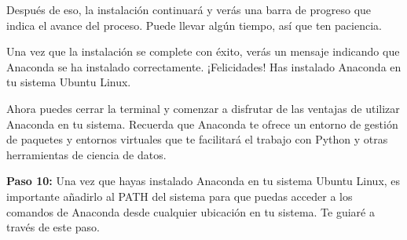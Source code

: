 \documentclass[
  letterpaper,
  DIV=11,
  numbers=noendperiod]{scrartcl}
\begin{document}
Después de eso, la instalación continuará y verás una barra de progreso
que indica el avance del proceso. Puede llevar algún tiempo, así que ten
paciencia.

Una vez que la instalación se complete con éxito, verás un mensaje
indicando que Anaconda se ha instalado correctamente. ¡Felicidades! Has
instalado Anaconda en tu sistema Ubuntu Linux.

Ahora puedes cerrar la terminal y comenzar a disfrutar de las ventajas
de utilizar Anaconda en tu sistema. Recuerda que Anaconda te ofrece un
entorno de gestión de paquetes y entornos virtuales que te facilitará el
trabajo con Python y otras herramientas de ciencia de datos.

\textbf{Paso 10:} Una vez que hayas instalado Anaconda en tu sistema
Ubuntu Linux, es importante añadirlo al PATH del sistema para que puedas
acceder a los comandos de Anaconda desde cualquier ubicación en tu
sistema. Te guiaré a través de este paso.
\end{document}
